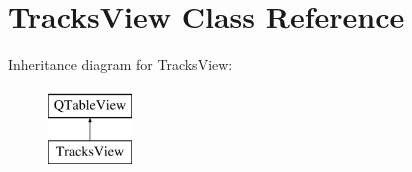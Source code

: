 \hypertarget{class_tracks_view}{}\section{Tracks\+View Class Reference}
\label{class_tracks_view}
Inheritance diagram for Tracks\+View\+:\begin{figure}[H]
\begin{center}
\leavevmode
\includegraphics[height=2.000000cm]{class_tracks_view}
\end{center}
\end{figure}
